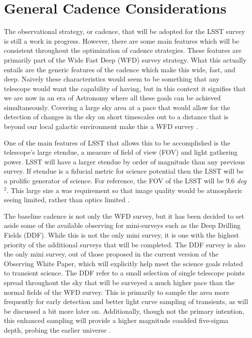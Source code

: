 \documentclass[11pt]{article}
\begin{document}
\section{General Cadence Considerations} %
The observational strategy, or cadence, that will be adopted for the LSST survey is still a work in progress. However, there are some main features which will be consistent throughout the optimization of cadence strategies. These features are primarily part of the Wide Fast Deep (WFD) survey strategy. What this actually entails are the generic features of the cadence which make this wide, fast, and deep. Naively these characteristics would seem to be something that any telescope would want the capability of having, but in this context it signifies that we are now in an era of Astronomy where all these goals can be achieved simultaneously. Covering a large sky area at a pace that would allow for the detection of changes in the sky on short timescales out to a distance that is beyond our local galactic environment make this a WFD survey \citep{LSSTScienceCollaboration2009}. \par
One of the main features of LSST that allows this to be accomplished is the telescope's large etendue, a measure of field of view (FOV) and light gathering power. LSST will have a larger etendue by order of magnitude than any previous survey. If etendue is a fiducial metric for science potential then the LSST will be a prolific generator of science. For reference, the FOV of the LSST will be 9.6 \textit{deg}$^2$. This large size a was requirement so that image quality would be atmospheric seeing limited, rather than optics limited \citep{LSSTScienceCollaboration2009}.  \par
The baseline cadence is not only the WFD survey, but it has been decided to set aside some of the available observing for mini-surveys such as the Deep Drilling Fields (DDF). While this is not the only mini survey, it is one with the highest priority of the additional surveys that will be completed. The DDF survey is also the only mini survey, out of those proposed in the current version of the Observing White Paper, which will explicitly help meet the science goals related to transient science. The DDF refer to a small selection of single telescope points spread throughout the sky that will be surveyed a much higher pace than the normal fields of the WFD survey. This is primarily to sample the area more frequently for early detection and better light curve sampling of transients, as will be discussed a bit more later on. Additionally, though not the primary intention, this enhanced sampling will provide a higher magnitude coadded five-sigma depth, probing the earlier universe \citep{LSSTScienceCollaboration2017}. \par
\end{document}
